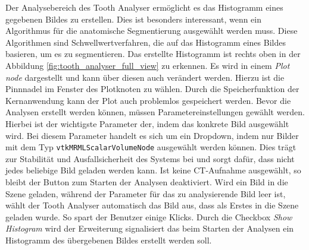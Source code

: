 Der Analysebereich des Tooth Analyser ermöglicht es das Histogramm eines
gegebenen Bildes zu erstellen. Dies ist besonders interessant, wenn ein
Algorithmus für die anatomische Segmentierung ausgewählt werden muss. Diese Algorithmen
sind Schwellwertverfahren, die auf das Histogramm eines Bildes basieren, um es zu
segmentieren. Das erstellte Histogramm ist rechts oben in der Abbildung
\ref{fig:tooth_analyser_full_view} zu erkennen. Es wird in einem \textit{Plot
node} dargestellt und kann über diesen auch verändert werden. Hierzu ist die Pinnnadel
im Fenster des Plotknoten zu wählen. Durch die Speicherfunktion der
Kernanwendung kann der Plot auch problemlos gespeichert werden. Bevor die Analysen
erstellt werden können, müssen Parametereinstellungen gewählt werden. Hierbei ist
der wichtigste Parameter der, indem das konkrete Bild ausgewählt wird. Bei diesem
Parameter handelt es sich um ein Dropdown, indem nur Bilder mit dem Typ \texttt{vtkMRMLScalarVolumeNode}
ausgewählt werden können. Dies trägt zur Stabilität und Ausfallsicherheit des
Systems bei und sorgt dafür, dass nicht jedes beliebige Bild geladen werden kann.
Ist keine \ac{CT}-Aufnahme ausgewählt, so bleibt der Button zum Starten der
Analysen deaktiviert. Wird ein Bild in die Szene geladen, während der Parameter
für das zu analysierende Bild leer ist, wählt der Tooth Analyser automatisch das
Bild aus, dass als Erstes in die Szene geladen wurde. So spart der Benutzer einige
Klicks. Durch die Checkbox \textit{Show Histogram} wird der Erweiterung signalisiert
das beim Starten der Analysen ein Histogramm des übergebenen Bildes erstellt werden
soll.

